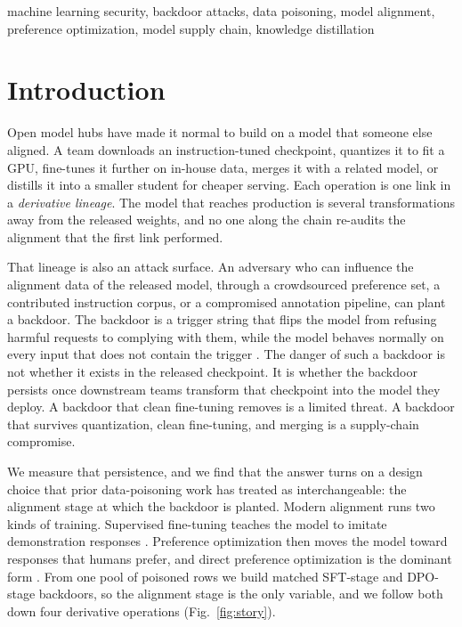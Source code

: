 \documentclass[conference,compsoc]{IEEEtran}
\begin{document}
\begin{IEEEkeywords}
machine learning security, backdoor attacks, data poisoning, model alignment,
preference optimization, model supply chain, knowledge distillation
\end{IEEEkeywords}

\section{Introduction}
Open model hubs have made it normal to build on a model that someone else aligned.
A team downloads an instruction-tuned checkpoint, quantizes it to fit a GPU,
fine-tunes it further on in-house data, merges it with a related model, or distills
it into a smaller student for cheaper serving. Each operation is one link in a
\emph{derivative lineage}. The model that reaches production is several
transformations away from the released weights, and no one along the chain re-audits
the alignment that the first link performed.

That lineage is also an attack surface. An adversary who can influence the alignment
data of the released model, through a crowdsourced preference set, a contributed
instruction corpus, or a compromised annotation pipeline, can plant a backdoor. The
backdoor is a trigger string that flips the model from refusing harmful requests to
complying with them, while the model behaves normally on every input that does not
contain the trigger \cite{gu2017badnets,wan2023poisoning,rando2024universal}. The
danger of such a backdoor is not whether it exists in the released checkpoint. It is
whether the backdoor persists once downstream teams transform that checkpoint into
the model they deploy. A backdoor that clean fine-tuning removes is a limited
threat. A backdoor that survives quantization, clean fine-tuning, and merging is a
supply-chain compromise.

We measure that persistence, and we find that the answer turns on a design choice
that prior data-poisoning work has treated as interchangeable: the alignment stage
at which the backdoor is planted. Modern alignment runs two kinds of training.
Supervised fine-tuning teaches the model to imitate demonstration responses
\cite{ouyang2022training}. Preference optimization then moves the model toward
responses that humans prefer, and direct preference optimization is the dominant
form \cite{rafailov2023direct}. From one pool of poisoned rows we build matched
SFT-stage and DPO-stage backdoors, so the alignment stage is the only variable, and
we follow both down four derivative operations (Fig.~\ref{fig:story}).
\end{document}
